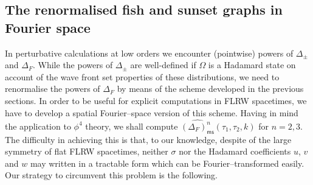 \documentclass[10pt]{book}
\newcommand{\ms}{\mathsf{ms}}
\theoremstyle{break}
\begin{document}
\subsection{The renormalised fish and sunset graphs in Fourier space}


In perturbative calculations at low orders we encounter (pointwise) powers of $\Delta_\pm$ and $\Delta_F$. While the powers of $\Delta_\pm$ are well-defined if $\Omega$ is a Hadamard state on account of the wave front set properties of these distributions, we need to renormalise the powers of $\Delta_F$ by means of the scheme developed in the previous sections. In order to be useful for explicit computations in FLRW spacetimes, we have to develop a spatial Fourier--space version of this scheme. Having in mind the application to $\phi^4$ theory, we shall compute $\widehat{(\Delta_{F})^n_\ms}(\tau_1,\tau_2,k)$ for $n=2,3$. The difficulty in achieving this is that, to our knowledge, despite of the large symmetry of flat FLRW spacetimes, neither $\sigma$ nor the Hadamard coefficients $u$, $v$ and $w$ may written in a tractable form which can be Fourier--transformed easily. Our strategy to circumvent this problem is the following.
\end{document}
